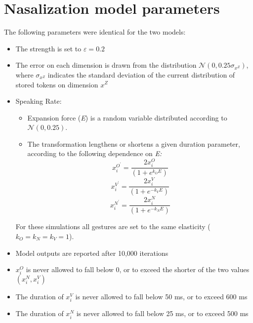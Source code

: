 \chapter{\label{chap:Appendix E}Nasalization model parameters}

The following parameters were identical for the two models:
\begin{itemize}
\item The  strength is set to $\varepsilon=0.2$
\item The  error on each  dimension is drawn from
the distribution $\mathcal{\mathscr{N}}\left(0,0.25\sigma_{x^{Z}}\right)$,
where $\sigma_{x^{Z}}$ indicates the standard deviation of the current
distribution of stored tokens on dimension $x^{Z}$
\item Speaking Rate:
\begin{itemize}
\item Expansion force (\emph{E}) is a random variable distributed according
to $\mathcal{\mathscr{N}\left(\mathrm{0,0.25}\right)}$. 
\item The  transformation lengthens or shortens a given duration
parameter, according to the following dependence on \emph{E:}
\begin{equation}
x_{i}^{O^{\prime}}=\frac{2x_{i}^{O}}{(1+e^{k_{O}E})}\label{eq:Speaking rate transform-1}
\end{equation}
\begin{equation}
x_{i}^{V^{\prime}}=\frac{2x_{i}^{V}}{(1+e^{-k_{V}E})}\label{eq:Speaking rate transform-1-1}
\end{equation}
\begin{equation}
x_{i}^{N^\prime}=\frac{2x_{i}^{N}}{(1+e^{-k_{N}E})}\label{eq:Speaking rate transform-1-1-1}
\end{equation}
\end{itemize}
For these simulations all gestures are set to the same elasticity
($k_{O}=k_{N}=k_{V}=1$). 
\item Model outputs are reported after 10,000 iterations
\item $x_{i}^{O}$ is never allowed to fall below 0, or to exceed the shorter
of the two values $(x_{i}^{N},x_{i}^{V})$
\item The duration of $x_{i}^{V}$ is never allowed to fall below 50 ms,
or to exceed 600 ms
\item The duration of $x_{i}^{N}$ is never allowed to fall below 25 ms,
or to exceed 500 ms
\end{itemize}

